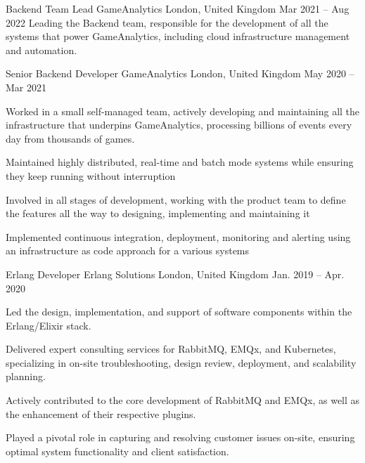 \begin{cventries}
  \cventry
    {Backend Team Lead} %
    {GameAnalytics} %
    {London, United Kingdom} %
    {Mar 2021 – Aug 2022} %
    {
      \responsibilities
        {Leading the Backend team, responsible for the development of all the
          systems that power GameAnalytics, including cloud infrastructure management and
          automation.}
    }

  \cventry
    {Senior Backend Developer} %
    {GameAnalytics} %
    {London, United Kingdom} %
    {May 2020 – Mar 2021} %
    {
      \responsibilities
        {Worked in a small self-managed team, actively developing and
        maintaining all the infrastructure that underpins GameAnalytics,
        processing billions of events every day from thousands of games.}
        \begin{cvitems} %
          \item {Maintained highly distributed, real-time and batch mode systems while ensuring they keep running without interruption}
          \item {Involved in all stages of development, working with the product team to
                 define the features all the way to designing, implementing and
                 maintaining it}
          \columnbreak
          \item {Implemented continuous integration, deployment, monitoring and
                 alerting using an infrastructure as code approach for a various
                 systems}
        \end{cvitems}
    }

  \cventry
    {Erlang Developer} %
    {Erlang Solutions} %
    {London, United Kingdom} %
    {Jan. 2019 – Apr. 2020} %
    {
      \begin{cvitems} %
        \item {Led the design, implementation, and support of software components within the Erlang/Elixir stack.}
        \item {Delivered expert consulting services for RabbitMQ, EMQx, and Kubernetes, specializing in on-site troubleshooting, design review, deployment, and scalability planning.}
        \item {Actively contributed to the core development of RabbitMQ and EMQx, as well as the enhancement of their respective plugins.}
        \item {Played a pivotal role in capturing and resolving customer issues on-site, ensuring optimal system functionality and client satisfaction.}
      \end{cvitems}
    }


\end{cventries}
